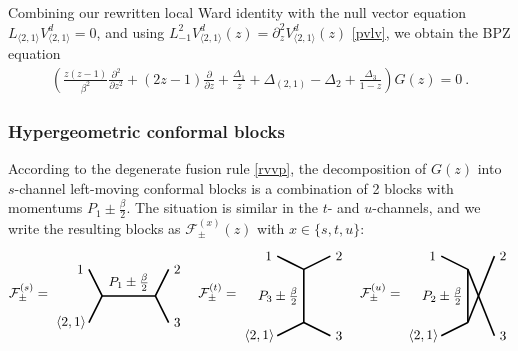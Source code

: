 \documentclass[12pt, a4paper]{article}
\begin{document}
Combining our rewritten local Ward identity with the null vector equation $L_{\langle 2,1\rangle}V^d_{\langle 2,1\rangle}=0$, and using $L_{-1}^2 V^d_{\langle 2,1\rangle}(z) = \partial_z^2 V^d_{\langle 2,1\rangle}(z)$ \eqref{pvlv}, we obtain the BPZ equation 
\begin{align}
 \left(\frac{z(z-1)}{\beta^2}\frac{\partial^2}{\partial z^2} + (2z-1)\frac{\partial}{\partial z} + \frac{\Delta_1}{z} + \Delta_{(2,1)}-\Delta_2  +\frac{\Delta_3}{1-z} \right) G(z) = 0 \ .
\end{align}

\subsubsection{Hypergeometric conformal blocks}

According to the degenerate fusion rule \eqref{rvvp}, the decomposition of $G(z)$ into $s$-channel left-moving conformal blocks is a combination of 2 blocks with momentums $P_1\pm \frac{\beta}{2}$. The situation is similar in the $t$- and $u$-channels, and we write the resulting blocks as $\mathcal{F}^{(x)}_\pm(z)$ with $x\in\{s,t,u\}$:
\begin{align}
\mathcal{F}^{(s)}_\pm = 
 \begin{tikzpicture}[baseline=(current  bounding  box.center), very thick, scale = .35]
\draw (-1,2) node [left] {$1$} -- (0,0) -- node [above] {$P_1\pm\frac{\beta}{2}$} (4,0) -- (5,2) node [right] {$2$};
\draw (-1,-2) node [left] {$\langle 2,1\rangle\!$} -- (0,0);
\draw (4,0) -- (5,-2) node [right] {$3$};
\end{tikzpicture}
\quad 
\mathcal{F}^{(t)}_\pm = 
\begin{tikzpicture}[baseline=(current  bounding  box.center), very thick, scale = .35]
 \draw (-2,3) node [left] {$1$} -- (0,2) -- node [left] {$P_3\pm\frac{\beta}{2}$} (0,-2) -- (-2, -3) node [left] {$\langle 2,1\rangle\!$};
\draw (0,2) -- (2,3) node [right] {$2$};
\draw (0,-2) -- (2, -3) node [right] {$3$};
\end{tikzpicture}
\quad 
\mathcal{F}^{(u)}_\pm = 
\begin{tikzpicture}[baseline=(current  bounding  box.center), very thick, scale = .35]
\draw (-2,1) node [left] {$1$} -- (0,0) -- node [left] {$P_2\pm \frac{\beta}{2}$} (0,-4) ;
\draw (0,0)-- (2,-5) node [right] {$3$};
\draw (-2,-5) node [left] {$\langle 2,1\rangle\!$} -- (0,-4);
\draw (0,-4) -- (2,1) node [right] {$2$};
\end{tikzpicture} 
\end{align}
\end{document}
